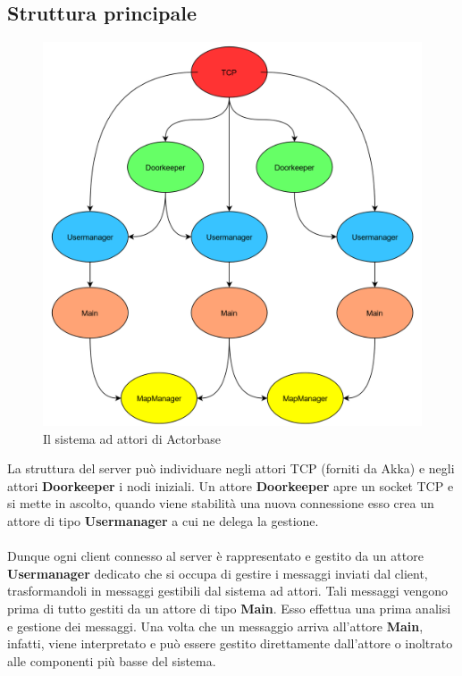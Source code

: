 \documentclass[a4paper]{article}
\begin{document}
	\subsection{Struttura principale}
					\begin{figure}[H]
					\centering
					\includegraphics[width=\textwidth]{immagini/ST/main}
					\caption{Il sistema ad attori di Actorbase}
				\end{figure}
		La struttura del server può individuare negli attori TCP (forniti da Akka) e negli attori \textbf{Doorkeeper} i nodi iniziali. Un attore \textbf{Doorkeeper} apre un socket TCP e si mette in ascolto, quando viene stabilità una nuova connessione esso crea un attore di tipo \textbf{Usermanager} a cui ne delega la gestione.
		\\ \\
		Dunque ogni client connesso al server è rappresentato e gestito da un attore \textbf{Usermanager} dedicato che si occupa di gestire i messaggi inviati dal client, trasformandoli in messaggi gestibili dal sistema ad attori. Tali messaggi vengono prima di tutto gestiti da un attore di tipo \textbf{Main}. Esso effettua una prima analisi e gestione dei messaggi. Una volta che un messaggio arriva all'attore \textbf{Main}, infatti, viene interpretato e può essere gestito direttamente dall'attore o inoltrato alle componenti più basse del sistema.
		
\end{document}
